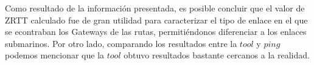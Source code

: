 Como resultado de la información presentada, es posible concluir que el valor de ZRTT calculado fue de gran utilidad para caracterizar el tipo de enlace en el que se econtraban los Gateways de las rutas, permitiéndonos diferenciar a los enlaces submarinos. Por otro lado, comparando los resultados entre la $tool$ y $ping$ podemos mencionar que la $tool$ obtuvo resultados bastante cercanos a la realidad.